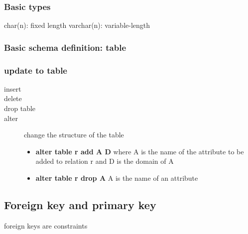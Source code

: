 \documentclass[11pt]{article}
\begin{document}
\subsubsection{Basic types}
\label{sec-6-1-1}
char(n): fixed length
varchar(n): variable-length
\subsubsection{Basic schema definition: table}
\label{sec-6-1-2}
\subsubsection{update to table}
\label{sec-6-1-3}
\begin{description}
\item[{insert}] 
\item[{delete}] 
\item[{drop table}] 
\item[{alter}] change the structure of the table
\begin{itemize}
\item \textbf{alter table r add A D}
where A is the name of the attribute to be added to relation
r and D is the domain of A
\item \textbf{alter table r drop A}
        A is the name of an attribute
\end{itemize}
\end{description}

\subsection{Foreign key and primary key}
\label{sec-6-2}
foreign keys are constraints
\end{document}
